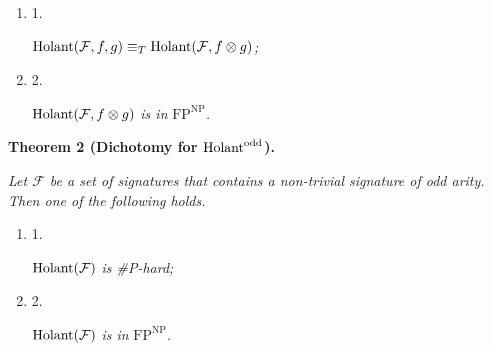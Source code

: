 \begin{enumerate}


\item[] 
1. 


$\textup{{Holant}}(\mathcal{F},f,g)\equiv_{T}\textup{{Holant}}(\mathcal{F},f\otimes g)$\emph{;}\par





\item[] 
2. 


$\textup{{Holant}}(\mathcal{F},f\otimes g)$\emph{ is in }$\text{FP}^{\text{NP}}$\emph{.}\par





\end{enumerate}







\par\medskip\noindent\textbf{
\textbf{Theorem 2}\textbf{ }(Dichotomy for $\textup{{Holant}}^{\text{odd}}$)\textbf{.}
}\par



\emph{Let $\mathcal{F}$ be a set of signatures that contains a non-trivial signature of odd arity. Then one of the following holds.}\par


\begin{enumerate}


\item[] 
1. 


$\textup{{Holant}}(\mathcal{F})$\emph{ is \#P-hard;}\par





\item[] 
2. 


$\textup{{Holant}}(\mathcal{F})$\emph{ is in }$\text{FP}^{\text{NP}}$\emph{.}\par





\end{enumerate}






